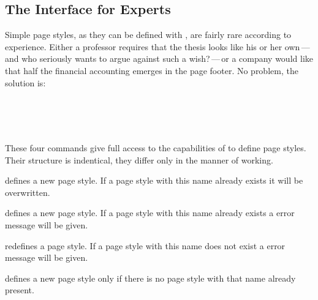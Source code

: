 \subsection{The Interface for Experts}
{}
Simple page styles, as they can be defined with ,
are fairly rare according to experience.  Either a professor requires
that the thesis looks like his or her own\,---\,and who seriously wants
to argue against such a wish?\,---\,or a company would like that half the
financial accounting emerges in the page footer.  No problem, the
solution is:
%
\begin{Declaration}
\\
\\
\\
\end{Declaration}%
%
%
These four commands give full access to the capabilities of
 to define page styles.  Their structure is
indentical, they differ only in the manner of working.
\begin{labeling}[\ --]{}
\item[\Macro{defpagestyle}] defines a new page style.
If a page style with this name already exists it will be overwritten.
\item[\Macro{newpagestyle}] defines a new page style.
If a page style with this name already exists a error message will be given.
\item[\Macro{renewpagestyle}] redefines a page style.
If a page style with this name does not exist a error message will be given.
\item[\Macro{providepagestyle}] defines a new page style only if there is no page style with that name already present.
\end{labeling}

